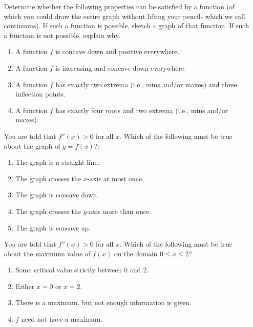 \documentclass{ximera}
\begin{document}
\begin{question}
Determine whether the following properties can be satisfied by a function (of which you could draw the entire graph without lifting your pencil- which we call continuous).  If such a function is possible, sketch a graph of that function.  If such a function is not possible, explain why.
\begin{enumerate}
  \item A function $f$ is concave down and positive everywhere.
  \item  A function $f$ is increasing and concave down everywhere.
  \item  A function $f$ has exactly two extrema (i.e., mins and/or maxes) and three inflection points.
  \item  A function $f$ has exactly four roots and two extrema (i.e., mins and/or maxes). 
  \end{enumerate}

\end{question}


\begin{question}
You are told that $f''(x) > 0$  for all $x$.  Which of the following must be true about the graph of $y = f(x)$?:
\begin{enumerate}
\item	The graph is a straight line.
\item	The graph crosses the $x$-axis at most once.
\item	The graph is concave down.
\item	The graph crosses the $y$-axis more than once.
\item	The graph is concave up.
\end{enumerate}
\end{question}


\begin{question}
You are told that $f''(x) > 0$ for all $x$.  Which of the following must be true about the maximum value of $f(x)$ on the domain  $0 \leq x \leq 2$?
\begin{enumerate}
\item	Some critical value strictly between $0$ and $2$.
\item	Either $x = 0$ or $x = 2$.
\item	There is a maximum, but not enough information is given.
\item	$f$ need not have a maximum.
\end{enumerate}
\end{question}
\end{document}
